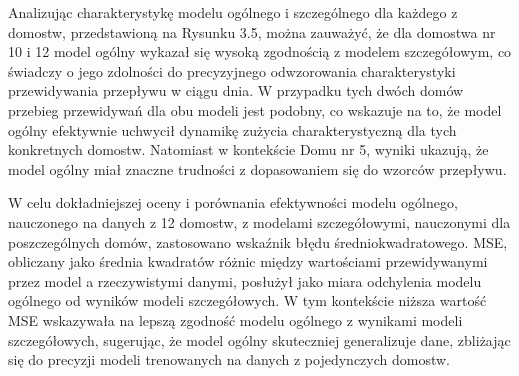 \documentclass[a4paper,twoside,12pt]{book}
\begin{document}
Analizując charakterystykę modelu ogólnego i szczególnego dla każdego z domostw, przedstawioną na Rysunku 3.5, można zauważyć, że dla domostwa nr 10 i 12 model ogólny wykazał się wysoką zgodnością z modelem szczegółowym, co świadczy o jego zdolności do precyzyjnego odwzorowania charakterystyki przewidywania przepływu w ciągu dnia. W przypadku tych dwóch domów przebieg przewidywań dla obu modeli jest podobny, co wskazuje na to, że model ogólny efektywnie uchwycił dynamikę zużycia charakterystyczną dla tych konkretnych domostw. Natomiast w kontekście Domu nr 5, wyniki ukazują, że model ogólny miał znaczne trudności z dopasowaniem się do wzorców przepływu.

W celu dokładniejszej oceny i porównania efektywności modelu ogólnego, nauczonego na danych z 12 domostw, z modelami szczegółowymi, nauczonymi dla poszczególnych domów, zastosowano wskaźnik błędu średniokwadratowego. MSE, obliczany jako średnia kwadratów różnic między wartościami przewidywanymi przez model a rzeczywistymi danymi, posłużył jako miara odchylenia modelu ogólnego od wyników modeli szczegółowych. W tym kontekście niższa wartość MSE wskazywała na lepszą zgodność modelu ogólnego z wynikami modeli szczegółowych, sugerując, że model ogólny skuteczniej generalizuje dane, zbliżając się do precyzji modeli trenowanych na danych z pojedynczych domostw.
\end{document}
